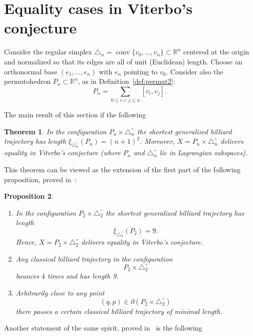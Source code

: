 \documentclass[12pt,a4paper,oneside]{amsart}
\newtheorem{theorem}{Theorem}[section]
\newtheorem{proposition}[theorem]{Proposition}
\theoremstyle{definition}
\theoremstyle{remark}
\numberwithin{equation}{section}
\DeclareMathOperator{\conv}{conv}
\begin{document}
\section{Equality cases in Viterbo's conjecture}
\label{sec:equality}

Consider the regular simplex $\triangle_n = \conv\{v_0, \ldots, v_n\} \subset \mathbb{R}^n$ centered at the origin and normalized so that its edges are all of unit (Euclidean) length. Choose an orthonormal base $(e_1, \ldots, e_n)$ with $e_n$ pointing to $v_0$. Consider also the permutohedron $P_n \subset \mathbb{R}^n$, as in Definition~\ref{def:permut2}:
$$
P_n = \sum_{0\le i<j \le n} [v_i,v_j].
$$

The main result of this section if the following

\begin{theorem}
\label{thm:viterboeq} In the configuration $P_n \times \triangle_n^\circ$ the shortest generalized billiard trajectory has length $\xi_{\triangle_n^\circ}(P_n) = (n+1)^2$. Moreover, $X = P_n \times \triangle_n^\circ$ delivers equality in Viterbo's conjecture (where $P_n$ and $\triangle_n^\circ$ lie in Lagrangian subspaces).
\end{theorem}

This theorem can be viewed as the extension of the first part of the following proposition, proved in~\cite{balitskiy2016shortest}:

\begin{proposition}
\label{prop:triangle}
\begin{enumerate}
\item
In the configuration $P_2 \times \triangle_2^{\circ}$ the shortest generalized billiard trajectory has length
$$
\xi_{\triangle_2^{\circ}}(P_2) = 9.
$$
Hence, $X = P_2 \times \triangle_2^{\circ}$ delivers equality in Viterbo's conjecture.

\item
Any classical billiard trajectory in the configuration
$$
P_2 \times \triangle_2^{\circ}
$$
bounces $4$ times and has length 9.

\item
Arbitrarily close to any point
$$
(q,p) \in \partial(P_2 \times \triangle_2^{\circ})
$$
there passes a certain classical billiard trajectory of minimal length.
\end{enumerate}
\end{proposition}

Another statement of the same spirit, proved in~\cite{balitskiy2016shortest} is the following
\end{document}
